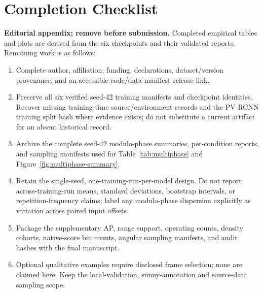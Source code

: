 \documentclass[10pt,twocolumn]{article}
\begin{document}
\section{Completion Checklist}
\label{app:checklist}
\textbf{Editorial appendix; remove before submission.} Completed empirical tables and plots are derived from the six checkpoints and their validated reports. Remaining work is as follows:
\begin{enumerate}
\item Complete author, affiliation, funding, declarations, dataset/version provenance, and an accessible code/data-manifest release link.
\item Preserve all six verified seed-42 training manifests and checkpoint identities. Recover missing training-time source/environment records and the PV-RCNN training split hash where evidence exists; do not substitute a current artifact for an absent historical record.
\item Archive the complete seed-42 modulo-phase summaries, per-condition reports, and sampling manifests used for Table~\ref{tab:multiphase} and Figure~\ref{fig:multiphase-summary}.
\item Retain the single-seed, one-training-run-per-model design. Do not report across-training-run means, standard deviations, bootstrap intervals, or repetition-frequency claims; label any modulo-phase dispersion explicitly as variation across paired input offsets.
\item Package the supplementary AP, range support, operating counts, density cohorts, native-score bin counts, angular sampling manifests, and audit hashes with the final manuscript.
\item Optional qualitative examples require disclosed frame selection; none are claimed here. Keep the local-validation, sunny-annotation and source-data sampling scope.
\end{enumerate}
\end{document}
